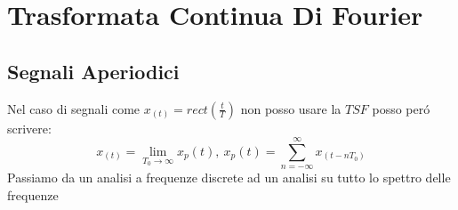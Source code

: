 \section{Trasformata Continua Di Fourier}
    \subsection{Segnali Aperiodici}
        Nel caso di segnali come $x_{(t)}=rect\left(\frac{t}{T}\right)$ non posso usare la $TSF$ posso peró scrivere:
        \[
            x_{(t)} = \lim_{T_0\rightarrow\infty} x_p(t) ,\ x_p(t) = \sum_{n = -\infty}^{\infty} x_{(t-nT_0)} 
        \]
        Passiamo da un analisi a frequenze discrete ad un analisi su tutto lo spettro delle frequenze
        \begin{figure}[H]
            \centering
            \hfill
        \end{figure}

